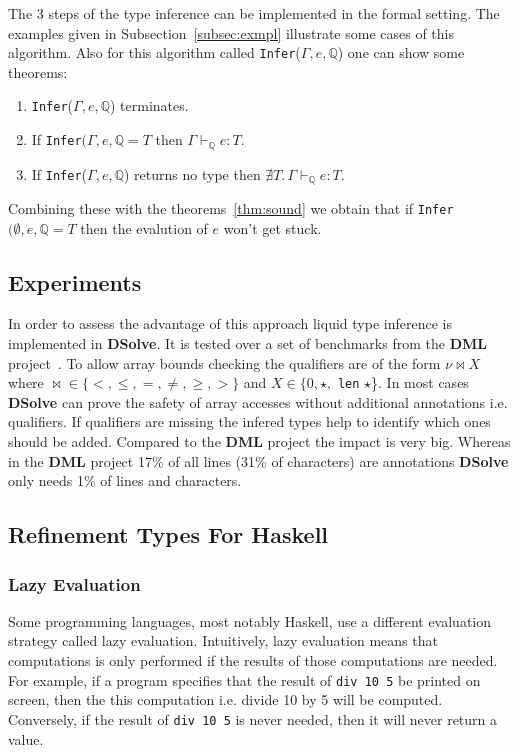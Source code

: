 \documentclass[a4paper,UKenglish]{lipics-v2016}
\begin{document}
The 3 steps of the type inference can be implemented in the formal setting.
The examples given in Subsection~\ref{subsec:exmpl} illustrate some cases of this algorithm.
Also for this algorithm called \lstinline{Infer}($\Gamma, e, \mathbb{Q}$) one can show some theorems:
\begin{enumerate}
    \item \lstinline{Infer}($\Gamma, e, \mathbb{Q}$) terminates.
    \item If \lstinline{Infer}$(\Gamma, e, \mathbb{Q} = T$ then $\Gamma \vdash_{\mathbb{Q}} e: T$.
    \item If \lstinline{Infer}($\Gamma, e, \mathbb{Q}$) returns no type then $\nexists T.\, \Gamma \vdash_{\mathbb{Q}} e: T$.
\end{enumerate}

Combining these with the theorems~\ref{thm:sound} we obtain that if \lstinline{Infer}$(\emptyset, e, \mathbb{Q} = T$ then the evalution of $e$ won't get stuck.

\subsection{Experiments}

In order to assess the advantage of this approach liquid type inference is implemented in \textbf{DSolve}.
It is tested over a set of benchmarks from the \textbf{DML} project~\cite{Xi:1998:EAB}.
To allow array bounds checking the qualifiers are of the form $\nu \bowtie X$ where $\bowtie \in \{<, \le, =, \neq, \geq, >\}$ and $X \in \{0, \star,$ \lstinline{len} $\star$\}.
In most cases \textbf{DSolve} can prove the safety of array accesses without additional annotations i.e. qualifiers.
If qualifiers are missing the infered types help to identify which ones should be added.
Compared to the \textbf{DML} project the impact is very big.
Whereas in the \textbf{DML} project 17\% of all lines (31\% of characters) are annotations \textbf{DSolve} only needs 1\% of lines and characters.

  \subsection{Refinement Types For Haskell}

    \subsubsection{Lazy Evaluation}

      Some programming languages, most notably Haskell, use a different
      evaluation strategy called lazy evaluation.  Intuitively, lazy evaluation
      means that computations is only performed if the results of those
      computations are needed.  For example, if a program specifies that the
      result of \texttt{div 10 5} be printed on screen, then the this
      computation i.e. divide 10 by 5 will be computed.  Conversely, if the
      result of \texttt{div 10 5} is never needed, then it will never return a
      value.  
\end{document}
